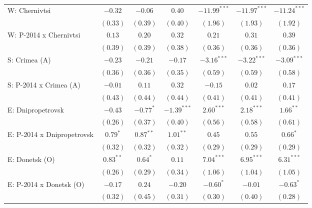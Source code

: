 \begin{table}
\begin{center}
\begin{small}
\begin{tabular}{l c c c c c c}
W: Chernivtsi               & $-0.32$       & $-0.06$     & $0.40$         & $-11.99^{***}$ & $-11.97^{***}$ & $-11.24^{***}$ \\
                            & $(0.33)$      & $(0.39)$    & $(0.40)$       & $(1.96)$       & $(1.93)$       & $(1.92)$       \\
W: P-2014 x Chernivtsi      & $0.13$        & $0.20$      & $0.32$         & $0.21$         & $0.31$         & $0.39$         \\
                            & $(0.39)$      & $(0.39)$    & $(0.38)$       & $(0.36)$       & $(0.36)$       & $(0.36)$       \\
S: Crimea (A)               & $-0.23$       & $-0.21$     & $-0.17$        & $-3.16^{***}$  & $-3.22^{***}$  & $-3.09^{***}$  \\
                            & $(0.36)$      & $(0.36)$    & $(0.35)$       & $(0.59)$       & $(0.59)$       & $(0.58)$       \\
S: P-2014 x Crimea (A)      & $-0.01$       & $0.11$      & $0.32$         & $-0.15$        & $0.02$         & $0.17$         \\
                            & $(0.43)$      & $(0.44)$    & $(0.44)$       & $(0.41)$       & $(0.41)$       & $(0.41)$       \\
E: Dnipropetrovsk           & $-0.43$       & $-0.77^{*}$ & $-1.39^{***}$  & $2.60^{***}$   & $2.18^{***}$   & $1.66^{**}$    \\
                            & $(0.26)$      & $(0.37)$    & $(0.40)$       & $(0.56)$       & $(0.58)$       & $(0.61)$       \\
E: P-2014 x Dnipropetrovsk  & $0.79^{*}$    & $0.87^{**}$ & $1.01^{**}$    & $0.45$         & $0.55$         & $0.66^{*}$     \\
                            & $(0.32)$      & $(0.32)$    & $(0.32)$       & $(0.29)$       & $(0.29)$       & $(0.29)$       \\
E: Donetsk (O)              & $0.83^{**}$   & $0.64^{*}$  & $0.11$         & $7.04^{***}$   & $6.95^{***}$   & $6.31^{***}$   \\
                            & $(0.26)$      & $(0.29)$    & $(0.34)$       & $(1.06)$       & $(1.04)$       & $(1.05)$       \\
E: P-2014 x Donetsk (O)     & $-0.17$       & $0.24$      & $-0.20$        & $-0.60^{*}$    & $-0.01$        & $-0.63^{*}$    \\
                            & $(0.32)$      & $(0.45)$    & $(0.31)$       & $(0.30)$       & $(0.40)$       & $(0.28)$       \\

\end{tabular}
\end{small}
\end{center}
\end{table}
